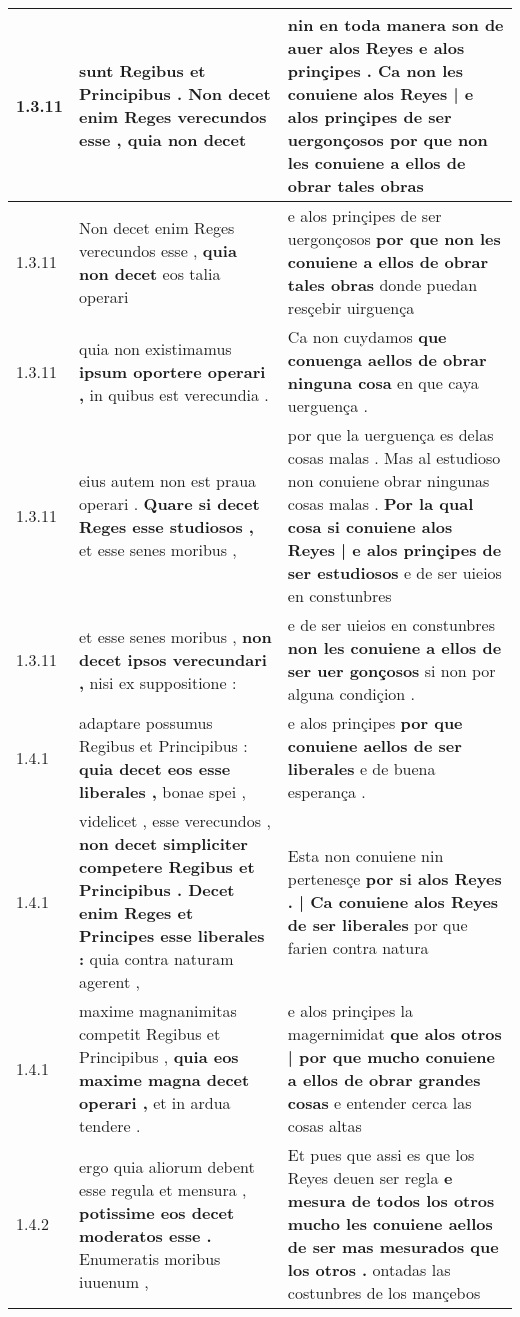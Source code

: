 \begin{tabular}{|p{1cm}|p{6.5cm}|p{6.5cm}|}
1.3.11 & sunt Regibus et Principibus . \textbf{ Non decet enim Reges verecundos esse , } quia non decet & nin en toda manera son de auer alos Reyes e alos prinçipes . \textbf{ Ca non les conuiene alos Reyes | e alos prinçipes de ser uergonçosos } por que non les conuiene a ellos de obrar tales obras \\\hline
1.3.11 & Non decet enim Reges verecundos esse , \textbf{ quia non decet } eos talia operari & e alos prinçipes de ser uergonçosos \textbf{ por que non les conuiene a ellos de obrar tales obras } donde puedan resçebir uirguença \\\hline
1.3.11 & quia non existimamus \textbf{ ipsum oportere operari , } in quibus est verecundia . & Ca non cuydamos \textbf{ que conuenga aellos de obrar ninguna cosa } en que caya uerguença . \\\hline
1.3.11 & eius autem non est praua operari . \textbf{ Quare si decet Reges esse studiosos , } et esse senes moribus , & por que la uerguença es delas cosas malas . Mas al estudioso non conuiene obrar ningunas cosas malas . \textbf{ Por la qual cosa si conuiene alos Reyes | e alos prinçipes de ser estudiosos } e de ser uieios en constunbres \\\hline
1.3.11 & et esse senes moribus , \textbf{ non decet ipsos verecundari , } nisi ex suppositione : & e de ser uieios en constunbres \textbf{ non les conuiene a ellos de ser uer gonçosos } si non por alguna condiçion . \\\hline
1.4.1 & adaptare possumus Regibus et Principibus : \textbf{ quia decet eos esse liberales , } bonae spei , & e alos prinçipes \textbf{ por que conuiene aellos de ser liberales } e de buena esperança . \\\hline
1.4.1 & videlicet , esse verecundos , \textbf{ non decet simpliciter competere Regibus et Principibus . Decet enim Reges et Principes esse liberales : } quia contra naturam agerent , & Esta non conuiene nin pertenesçe \textbf{ por si alos Reyes . | Ca conuiene alos Reyes de ser liberales } por que farien contra natura \\\hline
1.4.1 & maxime magnanimitas competit Regibus et Principibus , \textbf{ quia eos maxime magna decet operari , } et in ardua tendere . & e alos prinçipes la magernimidat \textbf{ que alos otros | por que mucho conuiene a ellos de obrar grandes cosas } e entender cerca las cosas altas \\\hline
1.4.2 & ergo quia aliorum debent esse regula et mensura , \textbf{ potissime eos decet moderatos esse . } Enumeratis moribus iuuenum , & Et pues que assi es que los Reyes deuen ser regla \textbf{ e mesura de todos los otros mucho les conuiene aellos de ser mas mesurados que los otros . } ontadas las costunbres de los mançebos \\\hline

\end{tabular}

